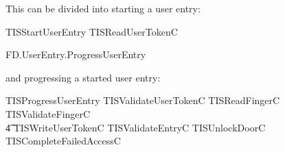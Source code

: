This can be divided into starting a user entry:
\begin{zed}
        TISStartUserEntry  TISReadUserTokenC
\end{zed}

\begin{traceunit}{FD.UserEntry.ProgressUserEntry}
\end{traceunit}

and progressing a started user entry:
\begin{zed}
        TISProgressUserEntry  
                     TISValidateUserTokenC 
                \lor TISReadFingerC 
                \lor TISValidateFingerC 
\\ \t4          \lor TISWriteUserTokenC   
                \lor TISValidateEntryC 
                \lor TISUnlockDoorC 
                \lor TISCompleteFailedAccessC 
\end{zed}









